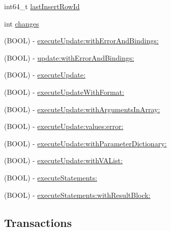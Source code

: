  \begin{DoxyCompactItemize}
\item 
int64\+\_\+t \mbox{\hyperlink{interface_o_p_t_l_y_f_m_d_b_database_af5291c062e84adebb1d7ca5319d33166}{last\+Insert\+Row\+Id}}
\item 
int \mbox{\hyperlink{interface_o_p_t_l_y_f_m_d_b_database_a757690d92c32d70c0c0402980cb14cee}{changes}}
\item 
(B\+O\+OL) -\/ \mbox{\hyperlink{interface_o_p_t_l_y_f_m_d_b_database_a1281526ad6641e7ef2198c3e9d971754}{execute\+Update\+:with\+Error\+And\+Bindings\+:}}
\item 
(B\+O\+OL) -\/ \mbox{\hyperlink{interface_o_p_t_l_y_f_m_d_b_database_a704a87863281b6dc997a9b31d09565ac}{update\+:with\+Error\+And\+Bindings\+:}}
\item 
(B\+O\+OL) -\/ \mbox{\hyperlink{interface_o_p_t_l_y_f_m_d_b_database_aacce81f6c3456a804e1d558462bca313}{execute\+Update\+:}}
\item 
(B\+O\+OL) -\/ \mbox{\hyperlink{interface_o_p_t_l_y_f_m_d_b_database_a5c251162dad20491a8b2a6278812c2e6}{execute\+Update\+With\+Format\+:}}
\item 
(B\+O\+OL) -\/ \mbox{\hyperlink{interface_o_p_t_l_y_f_m_d_b_database_a9e25e942df88213f251527ba03eafeea}{execute\+Update\+:with\+Arguments\+In\+Array\+:}}
\item 
(B\+O\+OL) -\/ \mbox{\hyperlink{interface_o_p_t_l_y_f_m_d_b_database_a0d75e3c094f6e03946a5b8278a215c42}{execute\+Update\+:values\+:error\+:}}
\item 
(B\+O\+OL) -\/ \mbox{\hyperlink{interface_o_p_t_l_y_f_m_d_b_database_a16f1eabe0aa7027ed5be1534e932399e}{execute\+Update\+:with\+Parameter\+Dictionary\+:}}
\item 
(B\+O\+OL) -\/ \mbox{\hyperlink{interface_o_p_t_l_y_f_m_d_b_database_a60bf317707b63828faee1d70f28f65f3}{execute\+Update\+:with\+V\+A\+List\+:}}
\item 
(B\+O\+OL) -\/ \mbox{\hyperlink{interface_o_p_t_l_y_f_m_d_b_database_ad8c3bdc64c602dac7827a4f560928168}{execute\+Statements\+:}}
\item 
(B\+O\+OL) -\/ \mbox{\hyperlink{interface_o_p_t_l_y_f_m_d_b_database_a11d5b1db0e9be3d5a0fb68d1c4bac0e3}{execute\+Statements\+:with\+Result\+Block\+:}}
\end{DoxyCompactItemize}
\subsection*{Transactions}
\label{_amgrp31112aca11d0e9e6eb7db96f317dda49}%



